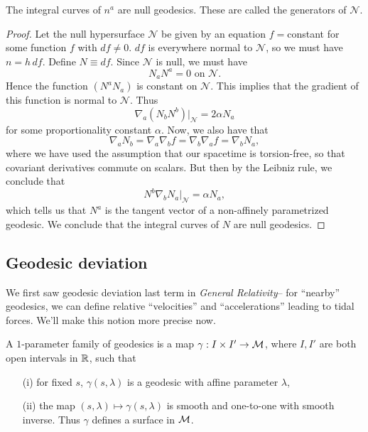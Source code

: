\begin{prop}
    The integral curves of $n^a$ are null geodesics. These are called the generators of $\mathcal{N}$.
\end{prop}
\begin{proof}
    Let the null hypersurface $\mathcal{N}$ be given by an equation $f={}$constant for some function $f$ with $df\neq 0$. $df$ is everywhere normal to $\mathcal{N}$, so we must have $n=h \,df$. Define $N\equiv df$. Since $\mathcal{N}$ is null, we must have
    \begin{equation}
        N_a N^a =0\text{ on }\mathcal{N}.
    \end{equation}
    Hence the function $(N^a N_a)$ is constant on $\mathcal{N}$. This implies that the gradient of this function is normal to $\mathcal{N}$. Thus
    \begin{equation}
        \nabla_a(N_b N^b)|_{\mathcal{N}}=2\alpha N_a
    \end{equation}
    for some proportionality constant $\alpha$. Now, we also have that
    \begin{equation*}
        \nabla_a N_b = \nabla_a \nabla_b f = \nabla_b \nabla_a f =\nabla_b N_a,
    \end{equation*}
    where we have used the assumption that our spacetime is torsion-free, so that covariant derivatives commute on scalars. But then by the Leibniz rule, we conclude that
    \begin{equation}
        N^b \nabla_b N_a|_{\mathcal{N}}=\alpha N_a,
    \end{equation}
    which tells us that $N^a$ is the tangent vector of a non-affinely parametrized geodesic. We conclude that the integral curves of $N$ are null geodesics.
\end{proof}

\subsection*{Geodesic deviation} We first saw geodesic deviation last term in \emph{General Relativity}-- for ``nearby'' geodesics, we can define relative ``velocities'' and ``accelerations'' leading to tidal forces. We'll make this notion more precise now.
\begin{defn}
    A $1$-parameter family of geodesics is a map $\gamma:I\times I'\to \mathcal{M}$, where $I,I'$ are both open intervals in $\mathbb{R}$, such that
    \begin{itemize}
        \item[(i)] for fixed $s$, $\gamma(s,\lambda)$ is a geodesic with affine parameter $\lambda$,
        \item[(ii)] the map $(s,\lambda)\mapsto \gamma(s,\lambda)$ is smooth and one-to-one with smooth inverse. Thus $\gamma$ defines a surface in $\mathcal{M}$.
    \end{itemize}
\end{defn}


